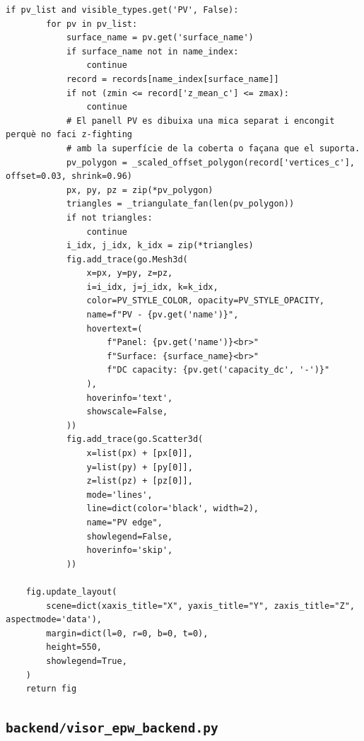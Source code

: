\documentclass[10pt,a4paper]{article}
\begin{document}
\begin{lstlisting}[style=studioPython,caption={backend/viewer\_3d\_backend.py},label={lst:backend-viewer-3d-backend-py}]
    if pv_list and visible_types.get('PV', False):
        for pv in pv_list:
            surface_name = pv.get('surface_name')
            if surface_name not in name_index:
                continue
            record = records[name_index[surface_name]]
            if not (zmin <= record['z_mean_c'] <= zmax):
                continue
            # El panell PV es dibuixa una mica separat i encongit perquè no faci z-fighting
            # amb la superfície de la coberta o façana que el suporta.
            pv_polygon = _scaled_offset_polygon(record['vertices_c'], offset=0.03, shrink=0.96)
            px, py, pz = zip(*pv_polygon)
            triangles = _triangulate_fan(len(pv_polygon))
            if not triangles:
                continue
            i_idx, j_idx, k_idx = zip(*triangles)
            fig.add_trace(go.Mesh3d(
                x=px, y=py, z=pz,
                i=i_idx, j=j_idx, k=k_idx,
                color=PV_STYLE_COLOR, opacity=PV_STYLE_OPACITY,
                name=f"PV - {pv.get('name')}",
                hovertext=(
                    f"Panel: {pv.get('name')}<br>"
                    f"Surface: {surface_name}<br>"
                    f"DC capacity: {pv.get('capacity_dc', '-')}"
                ),
                hoverinfo='text',
                showscale=False,
            ))
            fig.add_trace(go.Scatter3d(
                x=list(px) + [px[0]],
                y=list(py) + [py[0]],
                z=list(pz) + [pz[0]],
                mode='lines',
                line=dict(color='black', width=2),
                name="PV edge",
                showlegend=False,
                hoverinfo='skip',
            ))

    fig.update_layout(
        scene=dict(xaxis_title="X", yaxis_title="Y", zaxis_title="Z", aspectmode='data'),
        margin=dict(l=0, r=0, b=0, t=0),
        height=550,
        showlegend=True,
    )
    return fig
\end{lstlisting}


\subsection{\texorpdfstring{\texttt{backend/visor\_epw\_backend.py}}{backend/visor\_epw\_backend.py}}
\end{document}
